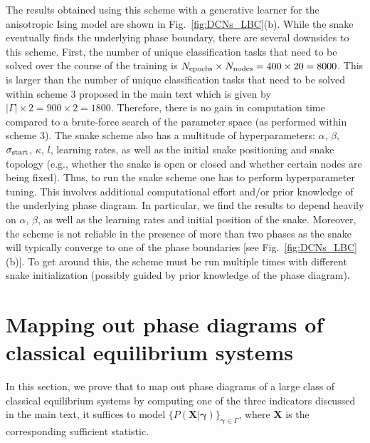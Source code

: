 The results obtained using this scheme with a generative learner for the anisotropic Ising model are shown in Fig.~\ref{fig:DCNs_LBC}(b). While the snake eventually finds the underlying phase boundary, there are several downsides to this scheme. First, the number of unique classification tasks that need to be solved over the course of the training is $N_{\rm epochs} \times N_{\rm nodes} = 400 \times 20 = 8000$. This is larger than the number of unique classification tasks that need to be solved within scheme 3 proposed in the main text which is given by $|\Gamma| \times 2 = 900 \times 2 = 1800$. Therefore, there is no gain in computation time compared to a brute-force search of the parameter space (as performed within scheme 3). The snake scheme also has a multitude of hyperparameters: $\alpha$, $\beta$, $\sigma_{\rm start}$, $\kappa$, $l$, learning rates, as well as the initial snake positioning and snake topology (e.g., whether the snake is open or closed and whether certain nodes are being fixed). Thus, to run the snake scheme one has to perform hyperparameter tuning. This involves additional computational effort and/or prior knowledge of the underlying phase diagram. In particular, we find the results to depend heavily on $\alpha$, $\beta$, as well as the learning rates and initial position of the snake. Moreover, the scheme is not reliable in the presence of more than two phases as the snake will typically converge to one of the phase boundaries [see Fig.~\ref{fig:DCNs_LBC}(b)]. To get around this, the scheme must be run multiple times with different snake initialization (possibly guided by prior knowledge of the phase diagram).\\  

\section{Mapping out phase diagrams of classical equilibrium systems}
In this section, we prove that to map out phase diagrams of a large class of classical equilibrium systems by computing one of the three indicators discussed in the main text, it suffices to model $\{ P(\bm{X}|\bm{\gamma})\}_{\bm{\gamma} \in \Gamma}$, where $\bm{X}$ is the corresponding sufficient statistic.

